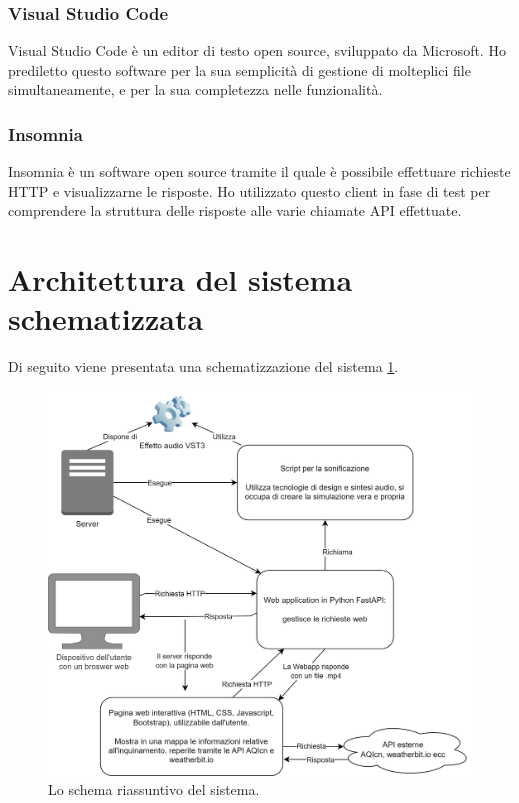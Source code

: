 \subsubsection{Visual Studio Code}
Visual Studio Code è un editor di testo open source, sviluppato da Microsoft.
Ho prediletto questo software per la sua semplicità di gestione di molteplici file simultaneamente, e per la sua completezza nelle funzionalità.
\subsubsection{Insomnia}
Insomnia è un software open source tramite il quale è possibile effettuare richieste HTTP e visualizzarne le risposte.
Ho utilizzato questo client in fase di test per comprendere la struttura delle risposte alle varie chiamate API effettuate.

\newpage
\section{Architettura del sistema schematizzata}
Di seguito viene presentata una schematizzazione del sistema \ref{fig:arch}.
\begin{figure}[H]
    \includegraphics[width=\linewidth,scale=0.2]{img/bigarch.png}
    \caption{Lo schema riassuntivo del sistema.}
    \label{fig:arch}
\end{figure}